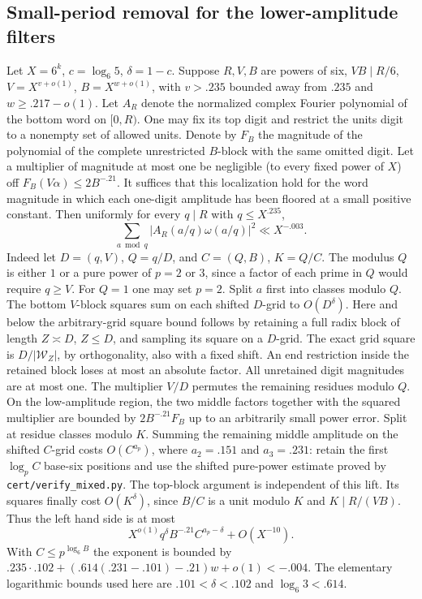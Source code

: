 \documentclass[11pt,a4paper]{article}
\theoremstyle{paperplain}
\numberwithin{equation}{section}
\begin{document}
\subsection{Small-period removal for the lower-amplitude filters}
Let $X=6^k$, $c=\log_6 5$, $\delta=1-c$. Suppose $R,V,B$ are powers of
six, $VB\mid R/6$, $V=X^{v+o(1)}$, $B=X^{w+o(1)}$, with $v>.235$
bounded away from $.235$ and $w\ge .217-o(1)$. Let $A_R$ denote the
normalized complex Fourier polynomial of the bottom word on $[0,R)$.
One may fix its top digit and restrict the units digit to a nonempty
set of allowed units. Denote by $F_B$ the magnitude of the polynomial of
the complete unrestricted $B$-block with the same omitted digit.
Let a multiplier of magnitude at most one be negligible (to every
fixed power of $X$) off $F_B(V\alpha)\le 2B^{-.21}$. It suffices that
this localization hold for the word magnitude in which each one-digit
amplitude has been floored at a small positive constant. Then uniformly
for every $q\mid R$ with $q\le X^{.235}$,
\[
  \sum_{a\bmod q} |A_R(a/q)\omega(a/q)|^2\ll X^{-.003}.
\]
Indeed let $D=(q,V)$, $Q=q/D$, and $C=(Q,B)$, $K=Q/C$. The modulus
$Q$ is either $1$ or a pure power of $p=2$ or $3$, since a factor of
each prime in $Q$ would require $q\ge V$. For $Q=1$ one may set $p=2$.
Split $a$ first into classes modulo $Q$. The bottom $V$-block squares
sum on each shifted $D$-grid to $O(D^\delta)$. Here and below the
arbitrary-grid square bound follows by retaining a full radix block of
length $Z\asymp D$, $Z\le D$, and sampling its square on a $D$-grid.
The exact grid square is $D/|\mathcal W_Z|$, by orthogonality, also
with a fixed shift. An end restriction inside the retained block loses
at most an absolute factor. All unretained digit magnitudes are at most
one. The multiplier $V/D$ permutes the remaining residues modulo $Q$.
On the low-amplitude region, the two middle factors together with the
squared multiplier are bounded by $2 B^{-.21}F_B$ up to an arbitrarily
small power error. Split at residue classes modulo $K$. Summing the
remaining middle amplitude on the shifted $C$-grid costs
$O(C^{a_p})$, where $a_2=.151$ and $a_3=.231$: retain the first
$\log_p C$ base-six positions and use the shifted pure-power estimate
proved by \texttt{cert/verify\_mixed.py}. The top-block argument is
independent of this lift. Its squares finally cost $O(K^\delta)$,
since $B/C$ is a unit modulo $K$ and $K\mid R/(VB)$.
Thus the left hand side is at most
\[
  X^{o(1)}q^\delta B^{-.21} C^{a_p-\delta}+O(X^{-10}).
\]
With $C\le p^{\log_6 B}$ the exponent is bounded by
$.235\cdot .102+(.614(.231-.101)-.21) w+o(1)<-.004$.
The elementary logarithmic bounds used here are
$.101<\delta<.102$ and $\log_6 3<.614$.
\end{document}

